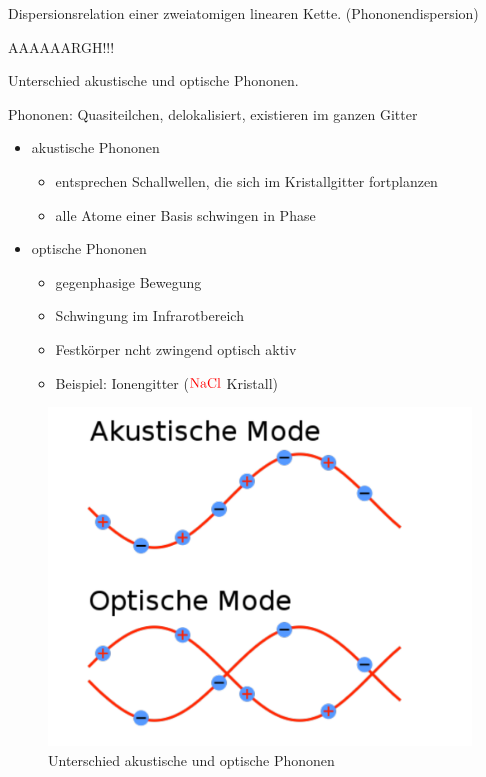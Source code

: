 \documentclass[a5paper,12pt,ngerman,grid=front %
,print
]{kartei}
\let\oldce\ce
\renewcommand*{\ce}[1]{\begingroup\color{red}\oldce{#1}\endgroup}
\begin{document}
	\begin{karte}{
		Dispersionsrelation einer zweiatomigen linearen Kette. (Phononendispersion)
		}
		
		AAAAAARGH!!! \\
		
	\end{karte}


	\begin{karte}{
		Unterschied akustische und optische Phononen.
		}
		
		Phononen: Quasiteilchen, delokalisiert, existieren im ganzen Gitter
		
		\begin{itemize}
			\item akustische Phononen
				\begin{itemize}
					\item entsprechen Schallwellen, die sich im Kristallgitter fortplanzen
					\item alle Atome einer Basis schwingen in Phase
				\end{itemize}
			\item optische Phononen 
				\begin{itemize}
					\item gegenphasige Bewegung
					\item Schwingung im Infrarotbereich
					\item Festkörper ncht zwingend optisch aktiv
					\item Beispiel: Ionengitter ($\ce{NaCl}$ Kristall)
				\end{itemize}
		\end{itemize}
		
		\begin{figure}[htbp]
			\centering
			\includegraphics[width=0.3\linewidth]{./images/36_phononen}
			\caption{Unterschied akustische und optische Phononen}
		\end{figure}
		
	\end{karte}
\end{document}
